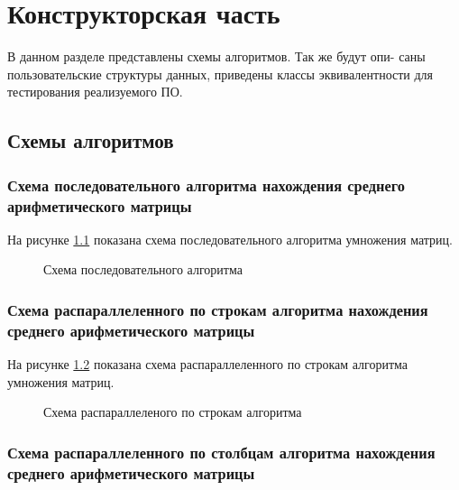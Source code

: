 
\chapter{Конструкторская часть}\label{Konstruct}

В данном разделе представлены схемы алгоритмов. Так же будут опи-
саны пользовательские структуры данных, приведены классы эквивалентности для тестирования реализуемого ПО.

\section{Схемы алгоритмов}\label{SchemaAlg}


\subsection{Схема последовательного алгоритма нахождения среднего арифметического матрицы}\label{SchemaPoslMatrixMultiply}

На рисунке \ref{ris:schemaposav} показана схема последовательного алгоритма умножения матриц.

\begin{figure}[H]
  \caption{Схема последовательного алгоритма}
  \label{ris:schemaposav}
\end{figure}

\subsection{Схема распараллеленного по строкам алгоритма нахождения среднего арифметического матрицы}\label{SchemaParRowMatrixMultiply}

На рисунке \ref{ris:schemaparrowav} показана схема распараллеленного по строкам алгоритма умножения матриц.

\begin{figure}[H]
  \caption{Схема распараллеленого по строкам алгоритма}
  \label{ris:schemaparrowav}
\end{figure}

\subsection{Схема распараллеленного по столбцам алгоритма нахождения среднего арифметического матрицы}\label{SchemaParColumnMatrixMultiply}

